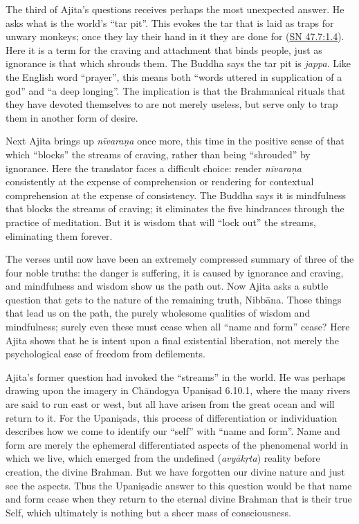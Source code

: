 \documentclass[12pt,openany]{book}%
\begin{document}
The third of Ajita’s questions receives perhaps the most unexpected answer. He asks what is the world’s “tar pit”. This evokes the tar that is laid as traps for unwary monkeys; once they lay their hand in it they are done for (\href{https://suttacentral.net/sn47.7/en/sujato\#1.4}{SN 47.7:1.4}). Here it is a term for the craving and attachment that binds people, just as ignorance is that which shrouds them. The Buddha says the tar pit is \textit{jappa}. Like the English word “prayer”, this means both “words uttered in supplication of a god” and “a deep longing”. The implication is that the Brahmanical rituals that they have devoted themselves to are not merely useless, but serve only to trap them in another form of desire.

Next Ajita brings up \textit{\textsanskrit{nīvaraṇa}} once more, this time in the positive sense of that which “blocks” the streams of craving, rather than being “shrouded” by ignorance. Here the translator faces a difficult choice: render \textit{\textsanskrit{nīvaraṇa}} consistently at the expense of comprehension or rendering for contextual comprehension at the expense of consistency. The Buddha says it is mindfulness that blocks the streams of craving; it eliminates the five hindrances through the practice of meditation. But it is wisdom that will “lock out” the streams, eliminating them forever.

The verses until now have been an extremely compressed summary of three of the four noble truths: the danger is suffering, it is caused by ignorance and craving, and mindfulness and wisdom show us the path out. Now Ajita asks a subtle question that gets to the nature of the remaining truth, \textsanskrit{Nibbāna}. Those things that lead us on the path, the purely wholesome qualities of wisdom and mindfulness; surely even these must cease when all “name and form” cease? Here Ajita shows that he is intent upon a final existential liberation, not merely the psychological ease of freedom from defilements.

Ajita’s former question had invoked the “streams” in the world. He was perhaps drawing upon the imagery in \textsanskrit{Chāndogya} \textsanskrit{Upaniṣad} 6.10.1, where the many rivers are said to run east or west, but all have arisen from the great ocean and will return to it. For the \textsanskrit{Upaniṣads}, this process of differentiation or individuation describes how we come to identify our “self” with “name and form”. Name and form are merely the ephemeral differentiated aspects of the phenomenal world in which we live, which emerged from the undefined (\textit{\textsanskrit{avyākṛta}}) reality before creation, the divine Brahman. But we have forgotten our divine nature and just see the aspects. Thus the \textsanskrit{Upaniṣadic} answer to this question would be that name and form cease when they return to the eternal divine Brahman that is their true Self, which ultimately is nothing but a sheer mass of consciousness.
\end{document}

